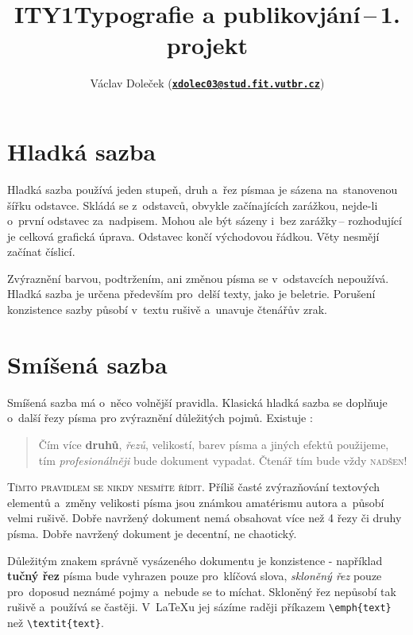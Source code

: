\documentclass[czech,a4paper,10pt,twocolumn]{article}
\title{ITY1}
\date{}
\title{Typografie a publikovjání\,--\,1. projekt\medskip}
\author{Václav Doleček (\texttt{\textbf{\href{mailto:xdolec03@stud.fit.vutbr.cz}{xdolec03@stud.fit.vutbr.cz}}})}
\begin{document}
\maketitle

\section{Hladká sazba}

Hladká sazba používá jeden stupeň, druh a~řez písma\linebreak a je sázena na~stanovenou šířku odstavce. Skládá se z~odstavců, obvykle začínajících zarážkou, nejde-li o~první odstavec za~nadpisem. Mohou ale být sázeny i~bez zarážky\,--  rozhodující je celková grafická úprava. Odstavec končí východovou řádkou. Věty nesmějí začínat číslicí.

Zvýraznění barvou, podtržením, ani změnou písma se v~odstavcích nepoužívá. Hladká sazba je určena především pro~delší texty, jako je beletrie. Porušení konzistence sazby působí v~textu rušivě a~unavuje čtenářův zrak.

\section{Smíšená sazba}

Smíšená sazba má o~něco volnější pravidla. Klasická hladká sazba se doplňuje o~další řezy písma pro zvýraznění důležitých pojmů. Existuje :

\begin{quote}
  Čím více \textbf{druhů}, \textit{řezů}, {\footnotesize velikostí}, barev písma \textsf{a jiných {\tiny efektů}} použijeme, tím \emph{profesionálněji} bude dokument vypadat. Čtenář tím {\large bude} {\LARGE vždy} \textsc{\Huge nadšen!}  
\end{quote}

\textsc{Tímto pravidlem se nikdy nesmíte řídit.} Příliš časté zvýrazňování textových elementů a~změny velikosti písma jsou známkou amatérismu autora a~působí velmi rušivě. Dobře navržený dokument nemá obsahovat více než
4 řezy či druhy písma. Dobře navržený dokument je decentní, ne chaotický.

Důležitým znakem správně vysázeného dokumentu je konzistence - například \textbf{tučný řez} písma bude vyhrazen pouze pro~klíčová slova, \emph{skloněný řez} pouze pro~doposud neznámé pojmy a~nebude se to míchat. Skloněný řez nepůsobí tak rušivě a~používá se častěji. V~\LaTeX u jej sázíme raději příkazem \verb|\emph{text}| než \verb|\textit{text}|.
\end{document}
